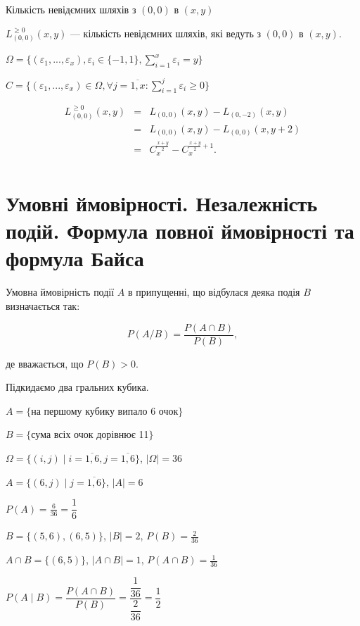 \begin{example}
        Кількість невідємних шляхів з $(0, 0)$ в $(x, y)$

    \beautifulImage
    
    $L_{(0, 0)}^{\geqslant 0}(x, y)$ --- кількість невідємних
    шляхів, які ведуть з $(0, 0)$ в $(x, y)$.

    $\Omega = \{ (\varepsilon_1, ..., \varepsilon_x),
    \varepsilon_i \in \{-1, 1\},
    \sum\limits_{i=1}^x \varepsilon_i = y \}$

    $C = \{ (\varepsilon_1, ..., \varepsilon_x) \in \Omega,
    \forall j = \overline{1, x}:
    \sum\limits_{i=1}^j \varepsilon_i \geqslant 0 \}$

    $$\begin{array}{rcl}
        L_{(0, 0)}^{\geqslant 0}(x, y) & = & L_{(0, 0)}(x, y) - L_{(0, -2)}(x, y) \\
         & = & L_{(0, 0)}(x, y) - L_{(0, 0)}(x, y + 2) \\
         & = & C_{x}^{\frac{x+y}{2}} - C_{x}^{\frac{x+y}{2} + 1}. \\
    \end{array}$$
    
\end{example}

\section{Умовні ймовірності. Незалежність подій. Формула повної ймовірності та формула Байса}

Умовна ймовірність події $A$ в припущенні, що відбулася деяка
подія $B$ визначається так:

$$P(A/B) = \frac{P(A \cap B)}{P(B)},$$

де вважається, що $P(B) > 0$.

\begin{example}
    Підкидаємо два гральних кубика.
    
    $A = \{$на першому кубику випало 6 очок$\}$
    
    $B = \{$сума всіх очок дорівнює 11$\}$
    
    $\Omega = \{ (i, j) \mid i = \overline{1, 6}, j = \overline{1, 6} \}$,
    $|\Omega| = 36$
    
    $A = \{ (6, j) \mid j = \overline{1, 6} \}$,
    $|A| = 6$
    
    $P(A) = \frac{6}{36} = \dfrac{1}{6}$
    
    $B = \{(5, 6), (6, 5)\}$, $|B| = 2$, $P(B) = \frac{2}{36}$
    
    $A \cap B = \{(6, 5)\}$, $|A \cap B| = 1$, $P(A \cap B) = \frac{1}{36}$
    
    $P(A \mid B)
    = \dfrac{P(A \cap B)}{P(B)}
    = \dfrac{\dfrac{1}{36}}{\dfrac{2}{36}}
    = \dfrac{1}{2}$
\end{example}

